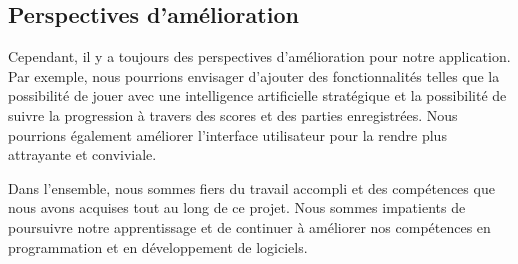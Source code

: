 \documentclass[12pt]{article}
\begin{document}
\subsection{Perspectives d'amélioration}
Cependant, il y a toujours des perspectives d'amélioration pour notre application. Par exemple, nous pourrions envisager d'ajouter des fonctionnalités telles que la possibilité de jouer avec une intelligence artificielle stratégique et la possibilité de suivre la progression à travers des scores et des parties enregistrées. Nous pourrions également améliorer l'interface utilisateur pour la rendre plus attrayante et conviviale.

Dans l'ensemble, nous sommes fiers du travail accompli et des compétences que nous avons acquises tout au long de ce projet. Nous sommes impatients de poursuivre notre apprentissage et de continuer à améliorer nos compétences en programmation et en développement de logiciels.
\end{document}
